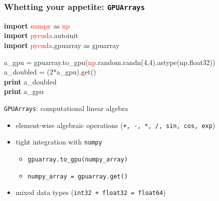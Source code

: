 \documentclass[]{beamer}
\begin{document}
\begin{frame}
    \frametitle{Whetting your appetite: \texttt{GPUArrays}}
        \ttfamily\footnotesize
        {\bf import} \textcolor{red}{numpy} as \textcolor{red}{np}\\
        {\bf import} \textcolor{red}{pycuda}.autoinit\\
        {\bf import} \textcolor{red}{pycuda}.gpuarray as gpuarray \\
        \vspace{.5mm}
     
        a\_gpu = gpuarray.to\_gpu(\textcolor{red}{np}.random.randn(4,4).astype(np.float32))\\
        a\_doubled = (2*a\_gpu).get() \\ 
        {\bf print} a\_doubled\\
        {\bf print} a\_gpu   
\begin{block}{\texttt{GPUArrays}: computational linear algebra}
\begin{itemize}
\sffamily
\item \small element-wise algebraic operations (\texttt{+, -, *, /, sin, cos, exp})
\item tight integration with \texttt{numpy}
\begin{itemize}
\item \small \texttt{gpuarray.to\_gpu(numpy\_array)}
\item \small \texttt{numpy\_array = gpuarray.get()}
\end{itemize}
\item \small mixed data types (\texttt{int32 + float32 = float64})
\end{itemize}
 

\end{block}
\end{frame}
\end{document}
